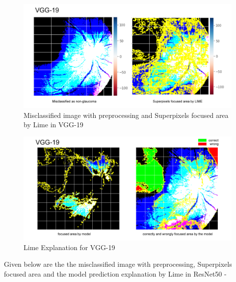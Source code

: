 \vspace{5mm}
\begin{figure}[hbt!]
\centering
\includegraphics[scale=0.45]{images/fig-48.png}
\caption{Misclassified image with preprocessing and Superpixels focused area by Lime in VGG-19}
\label{fig:x Misclassified image with preprocessing and Superpixels focused area by Lime in VGG-19}
\end{figure}

\vspace{5mm}
\begin{figure}[hbt!]
\centering
\includegraphics[scale=0.45]{images/fig-49.png}
\caption{Lime Explanation for VGG-19}
\label{fig:x Lime Explanation for VGG-19}
\end{figure}

\newpage
\vspace{5mm}
\noindent Given below are the the misclassified image with preprocessing, Superpixels focused area and the model prediction explanation by Lime in ResNet50 -

